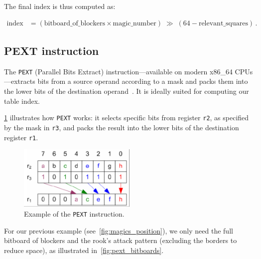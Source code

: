 \noindent The final index is thus computed as:

\begin{align*}
    \text{index} 
    &= (\text{bitboard\_of\_blockers} \times \text{magic\_number})
       \;\gg\;(64 - \text{relevant\_squares})\,.
\end{align*}

\subsection{PEXT instruction}

\noindent The \texttt{PEXT} (Parallel Bits Extract) instruction—available on modern x86\_64 CPUs—extracts bits from a source operand according to a mask and packs them into the lower bits of the destination operand~\cite{PextInstruction}. It is ideally suited for computing our table index.

\vspace{1em}

\noindent\cref{fig:pext_instruction_example} illustrates how \texttt{PEXT} works: it selects specific bits from register \texttt{r2}, as specified by the mask in \texttt{r3}, and packs the result into the lower bits of the destination register \texttt{r1}.

\vspace{1em}

\begin{figure}
    \centering
    \includegraphics[width=0.5\textwidth]{Imagenes/pext.png}
    \caption{Example of the \texttt{PEXT} instruction.}\label{fig:pext_instruction_example}
\end{figure}

\noindent For our previous example (see~\cref{fig:magics_position}), we only need the full bitboard of blockers and the rook’s attack pattern (excluding the borders to reduce space), as illustrated in~\cref{fig:pext_bitboards}.

\vspace{1em}

